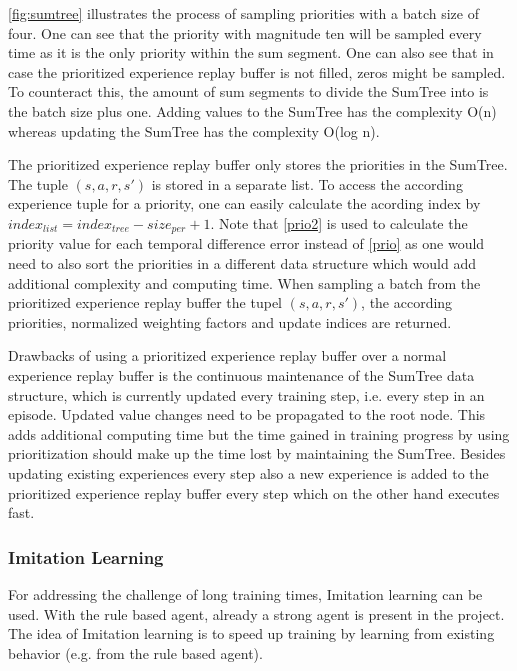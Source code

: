 \autoref{fig:sumtree} illustrates the process of sampling priorities with a batch size of four. One can see that the priority with magnitude ten will be sampled every time as it is the only priority within the sum segment. One can also see that in case the prioritized experience replay buffer is not filled, zeros might be sampled. To counteract this, the amount of sum segments to divide the SumTree into is the batch size plus one. Adding values to the SumTree has the complexity O(n) whereas updating the SumTree has the complexity O(log n). 

The prioritized experience replay buffer only stores the priorities in the SumTree. The tuple $(s,a,r,s')$ is stored in a separate list. To access the according experience tuple for a priority, one can easily calculate the acording index by $index_{list} = index_{tree} - size_{per} + 1$. Note that \autoref{prio2} is used to calculate the priority value for each temporal difference error instead of \autoref{prio} as one would need to also sort the priorities in a different data structure which would add additional complexity and computing time. When sampling a batch from the prioritized experience replay buffer the tupel $(s,a,r,s')$, the according priorities, normalized weighting factors and update indices are returned. 

Drawbacks of using a prioritized experience replay buffer over a normal experience replay buffer is the continuous maintenance of the SumTree data structure, which is currently updated every training step, i.e. every step in an episode. Updated value changes need to be propagated to the root node. This adds additional computing time but the time gained in training progress by using prioritization should make up the time lost by maintaining the SumTree. Besides updating existing experiences every step also a new experience is added to the prioritized experience replay buffer every step which on the other hand executes fast. 

\subsubsection{Imitation Learning}
\label{ch:approachBc}

For addressing the challenge of long training times, Imitation learning can be used. With the rule  based agent, already a strong agent is present in the project. The idea of Imitation learning is to speed up training by learning from existing behavior (e.g. from the rule based agent).

